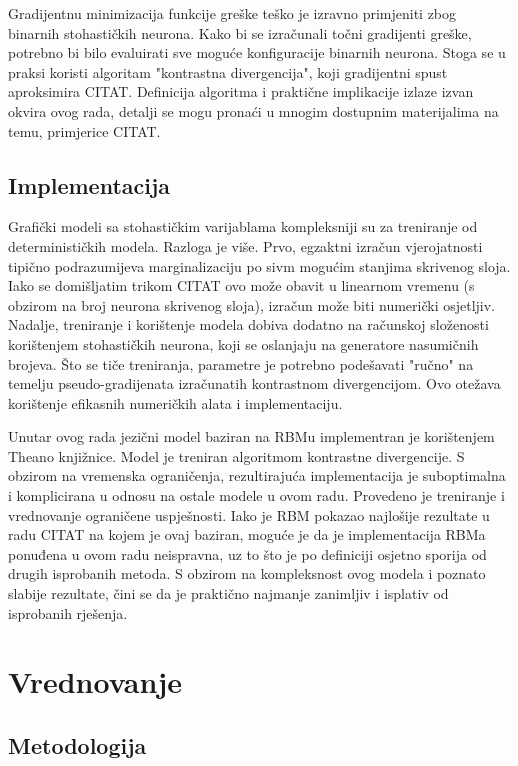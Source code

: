 \documentclass[times, utf8, diplomski, numeric]{fer}
\begin{document}
Gradijentnu minimizacija funkcije greške  teško je izravno primjeniti zbog binarnih stohastičkih neurona. Kako bi se izračunali točni gradijenti greške, potrebno bi bilo evaluirati sve moguće konfiguracije binarnih neurona. Stoga se u praksi koristi algoritam "kontrastna divergencija", koji gradijentni spust aproksimira CITAT. Definicija algoritma i praktične implikacije izlaze izvan okvira ovog rada, detalji se mogu pronaći u mnogim dostupnim materijalima na temu, primjerice CITAT.

\section{Implementacija}

Grafički modeli sa stohastičkim varijablama kompleksniji su za treniranje od determinističkih modela. Razloga je više. Prvo, egzaktni izračun vjerojatnosti tipično podrazumijeva marginalizaciju po sivm mogućim stanjima skrivenog sloja. Iako se domišljatim trikom CITAT ovo može obavit u linearnom vremenu (s obzirom na broj neurona skrivenog sloja), izračun može biti numerički osjetljiv. Nadalje, treniranje i korištenje modela dobiva dodatno na računskoj složenosti korištenjem stohastičkih neurona, koji se oslanjaju na generatore nasumičnih brojeva. Što se tiče treniranja, parametre je potrebno podešavati "ručno" na temelju pseudo-gradijenata izračunatih kontrastnom divergencijom. Ovo otežava korištenje efikasnih numeričkih alata i implementaciju.

Unutar ovog rada jezični model baziran na RBMu implementran je korištenjem Theano knjižnice. Model je treniran algoritmom kontrastne divergencije. S obzirom na vremenska ograničenja, rezultirajuća implementacija je suboptimalna i komplicirana u odnosu na ostale modele u ovom radu. Provedeno je treniranje i vrednovanje ograničene uspješnosti. Iako je RBM pokazao najlošije rezultate u radu CITAT na kojem je ovaj baziran, moguće je da je implementacija RBMa ponuđena u ovom radu neispravna, uz to što je po definiciji osjetno sporija od drugih isprobanih metoda. S obzirom na kompleksnost ovog modela i poznato slabije rezultate, čini se da je praktično najmanje zanimljiv i isplativ od isprobanih rješenja.

\chapter{Vrednovanje}
\label{sec:eval}

\section{Metodologija}
\end{document}
